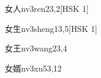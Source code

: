 \begin{entry}{女人}{nv3ren2}{3,2}[HSK 1]
\end{entry}

\begin{entry}{女生}{nv3sheng1}{3,5}[HSK 1]
\end{entry}

\begin{entry}{女王}{nv3wang2}{3,4}
\end{entry}

\begin{entry}{女婿}{nv3xu5}{3,12}
\end{entry}


